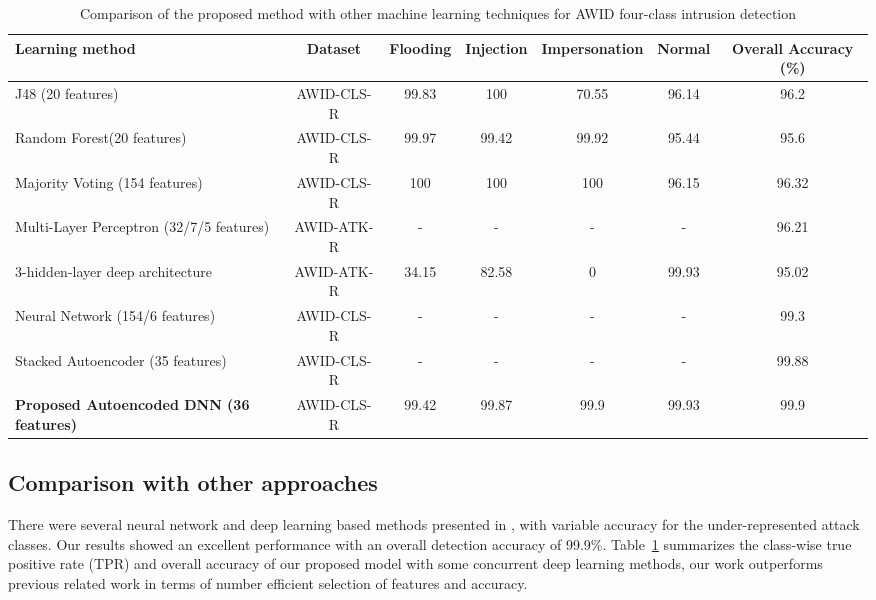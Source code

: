 \documentclass[letterpaper, 10pt, conference]{ieeeconf} %
\newcommand{\tab}[1]{Table~\ref{#1}}
\newcommand{\otoprule}{\midrule[\heavyrulewidth]}
\begin{document}
     \begin{table}
     \centering
    \caption{Comparison of the proposed method with other machine learning techniques for AWID four-class intrusion detection}   \label{table:performance_comparison}
  \begin{tabularx}{0.99\textwidth}{X  cc c c  cc}
    \toprule
    Learning method & Dataset  &  Flooding & Injection& Impersonation&Normal& Overall Accuracy (\%) \\
    \otoprule
   J48 (20 features) \cite{AWID_main}&AWID-CLS-R&99.83&100&70.55&96.14&96.2 
\\
     Random Forest(20 features) \cite{AWID_main}& AWID-CLS-R  &99.97&99.42&99.92&95.44& 95.6 \\ 
    
  Majority Voting (154 features)  \cite{alotaibi2016majority}& AWID-CLS-R&100&100&100&96.15  &96.32   \\
    \hline
    
    Multi-Layer Perceptron (32/7/5 features)   \cite{abdulhammed2018machine}&AWID-ATK-R &-&-&- &-& 96.21 \\
    3-hidden-layer deep architecture\cite{thing2017ieee}&AWID-ATK-R &34.15&82.58&0& 99.93&95.02 \\
    Neural Network (154/6 features)\cite{kaleem2016cognitive}&AWID-CLS-R  &-&-&-&-& 99.3 \\
   Stacked Autoencoder (35 features)\cite{aminanto2018deep}&AWID-CLS-R  &-&-&-&-& 99.88 \\
    
 \bf{ Proposed Autoencoded DNN (36 features)} &  AWID-CLS-R  &99.42&99.87 &99.9&99.93&99.9 \\
    \bottomrule
  \end{tabularx}
\end{table}



\subsection{Comparison with other approaches}

 There were several neural network and deep learning based methods presented in \cite{kaleem2016cognitive, aminanto2017improving,aminanto2018deep,thing2017ieee}, with variable accuracy for the under-represented attack classes. Our results showed an excellent performance with an overall detection accuracy of  99.9\%. \tab{table:performance_comparison} summarizes the class-wise true positive rate (TPR) and overall accuracy of our proposed model with some concurrent deep learning methods, our work outperforms previous related work in terms of number efficient selection of features and accuracy. 
   
\end{document}
